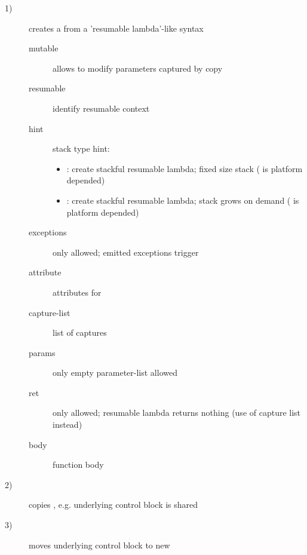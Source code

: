 \begin{description}
    \item[1)] creates a \ectx from a 'resumable lambda'-like syntax
              \begin{description}
                  \item[mutable]      allows to modify parameters captured by copy
                  \item[resumable]    identify resumable context
                  \item[hint]         stack type hint:
                                      \begin{itemize}
                                          \item {}:
                                              create stackful resumable lambda;
                                              fixed size stack ( is
                                              platform depended)
                                          \item {}:
                                              create stackful resumable lambda;
                                              stack grows on demand (
                                              is platform depended)
                                      \end{itemize}
                  \item[exceptions]   only  allowed; emitted exceptions
                                      trigger 
                  \item[attribute]    attributes for 
                  \item[capture-list] list of captures
                  \item[params]       only empty parameter-list allowed
                  \item[ret]          only  allowed; resumable lambda returns nothing
                                      (use of capture list instead)
                  \item[body]         function body\\
              \end{description}
    \item[2)] copies \ectx, e.g. underlying control block is shared
    \item[3)] moves underlying control block to new \ectx
\end{description}

